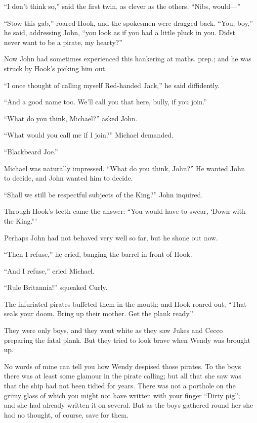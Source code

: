 ``I don't think so,'' said the first twin, as clever as the others.
``Nibs, would—''

``Stow this gab,'' roared Hook, and the spokesmen were dragged back.
``You, boy,'' he said, addressing John, ``you look as if you had a little
pluck in you. Didst never want to be a pirate, my hearty?''

Now John had sometimes experienced this hankering at maths. prep.; and
he was struck by Hook's picking him out.

``I once thought of calling myself Red-handed Jack,'' he said
diffidently.

``And a good name too. We'll call you that here, bully, if you join.''

``What do you think, Michael?'' asked John.

``What would you call me if I join?'' Michael demanded.

``Blackbeard Joe.''

Michael was naturally impressed. ``What do you think, John?'' He wanted
John to decide, and John wanted him to decide.

``Shall we still be respectful subjects of the King?'' John inquired.

Through Hook's teeth came the answer: ``You would have to swear, ‘Down
with the King.'''

Perhaps John had not behaved very well so far, but he shone out now.

``Then I refuse,'' he cried, banging the barrel in front of Hook.

``And I refuse,'' cried Michael.

``Rule Britannia!'' squeaked Curly.

The infuriated pirates buffeted them in the mouth; and Hook roared out,
``That seals your doom. Bring up their mother. Get the plank ready.''

They were only boys, and they went white as they saw Jukes and Cecco
preparing the fatal plank. But they tried to look brave when Wendy was
brought up.

No words of mine can tell you how Wendy despised those pirates. To the
boys there was at least some glamour in the pirate calling; but all
that she saw was that the ship had not been tidied for years. There was
not a porthole on the grimy glass of which you might not have written
with your finger ``Dirty pig''; and she had already written it on
several. But as the boys gathered round her she had no thought, of
course, save for them.

